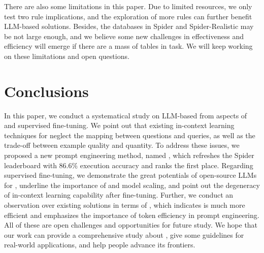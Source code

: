 There are also some limitations in this paper. 
Due to limited resources, we only test two rule implications, and the exploration of more rules can further benefit LLM-based \nlsql solutions. 
Besides, the databases in Spider and Spider-Realistic may be not large enough, and we believe some new challenges in effectiveness and efficiency will emerge if there are a mass of tables in \nlsql task.  
We will keep working on these limitations and open questions. 

\section{Conclusions}
\label{sec:conclusion}

In this paper, we conduct a systematical study on LLM-based \nlsql from aspects of 
 and supervised fine-tuning. 
We point out that existing in-context learning techniques for \nlsql neglect the mapping between questions and queries, as well as the trade-off between example quality and quantity. 
To address these issues, we proposed a new prompt engineering method, named \ours, which refreshes the Spider leaderboard with $86.6\%$ execution accuracy and ranks the first place. 
Regarding supervised fine-tuning, we demonstrate the great potentials of open-source LLMs for \nlsql, underline the importance of 
 and model scaling, and point out the degeneracy of in-context learning capability after fine-tuning. 
Further, we conduct an observation over existing solutions in terms of , which indicates \ours is much more efficient and emphasizes the importance of token efficiency in prompt engineering. 
All of these are open challenges and opportunities for future study.
We hope that our work can provide a comprehensive study about \nlsql, give some guidelines for real-world applications, and help people advance its frontiers. 

\clearpage

